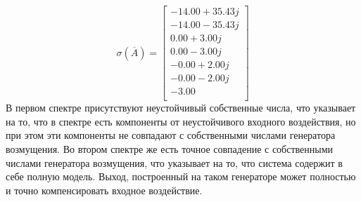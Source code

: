 \begin{equation}
    \sigma(\overline{A}) = \begin{bmatrix}
        -14.00 + 35.43j \\ 
        -14.00 - 35.43j \\ 
        0.00 + 3.00j \\ 
        0.00 - 3.00j \\ 
        -0.00 + 2.00j \\ 
        -0.00 - 2.00j \\ 
        -3.00 \\ 
    \end{bmatrix}
\end{equation}
В первом спектре присутствуют неустойчивый собственные числа, что указывает на то, что в 
спектре есть компоненты от неустойчивого входного воздействия, но при этом эти компоненты не 
совпадают с собственными числами генератора возмущения. Во втором спектре же есть точное 
совпадение с собственными числами генератора возмущения, что указывает на то, что система
содержит в себе полную модель. Выход, построенный на таком генераторе может полностью и точно 
компенсировать входное воздействие. 

